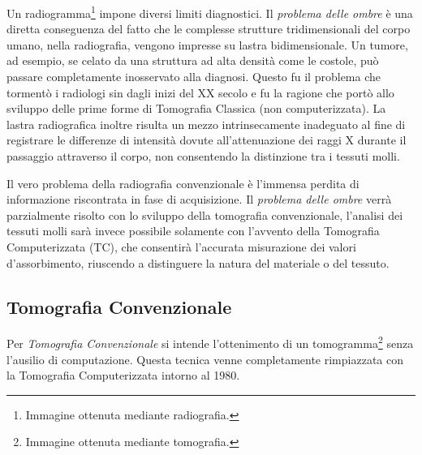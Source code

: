 \documentclass[a4paper,12pt, doubleside]{report}
\begin{document}
                \bigskip 
                \par
                    Un radiogramma\footnote{Immagine ottenuta mediante radiografia.} impone diversi limiti diagnostici. Il \textit{problema delle ombre} è una diretta conseguenza del fatto che le complesse strutture tridimensionali del corpo umano, nella radiografia, vengono impresse su lastra bidimensionale. Un tumore, ad esempio, se celato da una struttura ad alta densità come le costole, può passare completamente inosservato alla diagnosi. Questo fu il problema che tormentò i radiologi sin dagli inizi del XX secolo e fu la ragione che portò allo sviluppo delle prime forme di Tomografia Classica (non computerizzata).
                    La lastra radiografica inoltre risulta un mezzo intrinsecamente inadeguato al fine di registrare le differenze di intensità dovute all'attenuazione dei raggi X durante il passaggio attraverso il corpo, non consentendo la distinzione tra i tessuti molli.
                
                \bigskip            
                \par
                    Il vero problema della radiografia convenzionale è l'immensa perdita di informazione riscontrata in fase di acquisizione. Il \textit{problema delle ombre} verrà parzialmente risolto con lo sviluppo della tomografia convenzionale, l'analisi dei tessuti molli sarà invece possibile solamente con l'avvento della Tomografia Computerizzata (TC), che consentirà l'accurata misurazione dei valori d'assorbimento, riuscendo a distinguere la natura del materiale o del tessuto.
                            
            \subsection{Tomografia Convenzionale}
            \label{sub:TomografiaConvenzionale}
                \par
                    Per \textit{Tomografia Convenzionale} si intende l'ottenimento di un tomogramma\footnote{Immagine ottenuta mediante tomografia.} senza l'ausilio di computazione. Questa tecnica venne completamente rimpiazzata con la Tomografia Computerizzata intorno al 1980.
                
\end{document}
